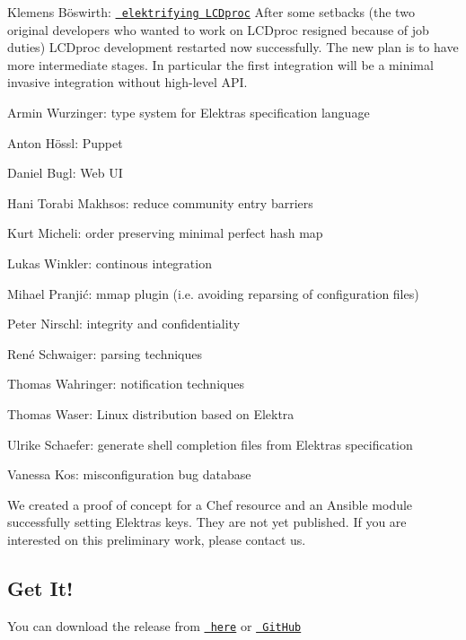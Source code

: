 \begin{DoxyItemize}
\item Klemens Böswirth\+: \href{https://www.libelektra.org/news/elektrify-lcdproc}{\texttt{ elektrifying L\+C\+Dproc}} After some setbacks (the two original developers who wanted to work on L\+C\+Dproc resigned because of job duties) L\+C\+Dproc development restarted now successfully. The new plan is to have more intermediate stages. In particular the first integration will be a minimal invasive integration without high-\/level A\+PI.
\item Armin Wurzinger\+: type system for Elektra\textquotesingle{}s specification language
\item Anton Hössl\+: Puppet
\item Daniel Bugl\+: Web UI
\item Hani Torabi Makhsos\+: reduce community entry barriers
\item Kurt Micheli\+: order preserving minimal perfect hash map
\item Lukas Winkler\+: continous integration
\item Mihael Pranjić\+: mmap plugin (i.\+e. avoiding reparsing of configuration files)
\item Peter Nirschl\+: integrity and confidentiality
\item René Schwaiger\+: parsing techniques
\item Thomas Wahringer\+: notification techniques
\item Thomas Waser\+: Linux distribution based on Elektra
\item Ulrike Schaefer\+: generate shell completion files from Elektra\textquotesingle{}s specification
\item Vanessa Kos\+: misconfiguration bug database
\item We created a proof of concept for a Chef resource and an Ansible module successfully setting Elektra\textquotesingle{}s keys. They are not yet published. If you are interested on this preliminary work, please contact us.
\end{DoxyItemize}\hypertarget{doc_news_2018-05-13_0_8_23_md_autotoc_md2211}{}\subsection{Get It!}\label{doc_news_2018-05-13_0_8_23_md_autotoc_md2211}
You can download the release from \href{https://www.libelektra.org/ftp/elektra/releases/elektra-0.8.23.tar.gz}{\texttt{ here}} or \href{https://github.com/ElektraInitiative/ftp/blob/master/releases/elektra-0.8.23.tar.gz?raw=true}{\texttt{ Git\+Hub}}

